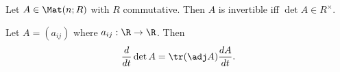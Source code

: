 \documentclass{article}
\begin{document}
\begin{corollary}[Notes 4.4.11]
    Let $A\in\Mat(n;R)$ with $R$ commutative. Then $A$ is invertible iff $\det A\in R^\times$. 
\end{corollary}

\begin{theorem}
    Let $A=(a_{ij})$ where $a_{ij}:\R\to\R$. Then
    \begin{align*}
        \frac{d}{dt}\det A = \tr(\adj A)\frac{dA}{dt}.
    \end{align*} 
\end{theorem}
\end{document}
